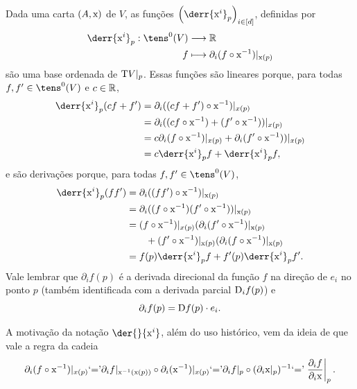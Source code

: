 Dada uma carta $(A,\mathrm{x})$ de $V$, as funções $\left( \derr{\x^i}_{p} \right)_{i \in [d]}$, definidas por
	\begin{align*}
	\func{\derr{\x^i}_p}{\tens^0(V)}{\R}{f}{\partial_i(f \circ \x\inv)|_{\x(p)}}
	\end{align*}
são uma base ordenada de $\mathrm{T} V|_p$. Essas funções são lineares porque, para todas $f,f' \in \tens^0(V)$ e $c \in \mathbb{R}$,
	\begin{align*}
	\derr{\x^i}_p(cf+f') &= \partial_i((cf+f') \circ \x\inv)|_{x(p)} \\
		&= \partial_i((cf \circ \x\inv) + (f' \circ \x\inv))|_{x(p)} \\
		&= c\partial_i(f \circ \x\inv)|_{x(p)} + \partial_i(f' \circ \x\inv))|_{x(p)} \\
		&= c\derr{\x^i}_p f + \derr{\x^i}_p f,
	\end{align*}
e são derivações porque, para todas $f,f' \in \tens^0(V)$,
	\begin{align*}
	\derr{\x^i}_p(ff') &= \partial_i ((ff') \circ \x\inv)|_{\x(p)} \\
		&= \partial_i ((f \circ \x\inv)(f' \circ \x\inv))|_{\x(p)} \\
		&= (f \circ \x\inv)|_{x(p)}(\partial_i (f' \circ \x\inv)|_{\x(p)} \\
		&\qquad + (f' \circ \x\inv)|_{\x(p)}(\partial_i (f \circ \x\inv)|_{\x(p)} \\
		&= f(p)\derr{\x^i}_p f +  f'(p)\derr{\x^i}_p f'.
	\end{align*}
Vale lembrar que $\partial_i f(p)$ é a derivada direcional da função $f$ na direção de $e_i$ no ponto $p$ (também identificada com a derivada parcial $\mathrm{D}_i f(p)$) e
	\begin{equation*}
	\partial_i f(p) = \mathrm{D} f(p) \cdot e_i.
	\end{equation*}

A motivação da notação $\der{}{\x^i}$, além do uso histórico, vem da ideia de que vale a regra da cadeia
	\begin{align*}
	\partial_i(f \circ \mathrm{x}^{-1})|_{x(p)} \text{`='} \partial_i f|_{\mathrm{x}^{-1}(\mathrm{x}(p))} \circ \partial_i(\mathrm{x}^{-1})|_{x(p)} \text{`='} \partial_i f|_p \circ (\partial_i \mathrm{x}|_p)^{-1} \text{`='} \left.\frac{\partial_i f}{\partial_i \mathrm{x}}\right|_p.
	\end{align*}


